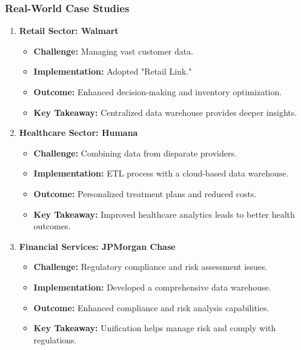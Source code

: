 \documentclass{beamer}
\begin{document}
\begin{frame}[fragile]
    \frametitle{Real-World Case Studies}
    \begin{enumerate}
        \item \textbf{Retail Sector: Walmart}
        \begin{itemize}
            \item \textbf{Challenge:} Managing vast customer data.
            \item \textbf{Implementation:} Adopted "Retail Link."
            \item \textbf{Outcome:} Enhanced decision-making and inventory optimization.
            \item \textbf{Key Takeaway:} Centralized data warehouse provides deeper insights.
        \end{itemize}
        
        \item \textbf{Healthcare Sector: Humana}
        \begin{itemize}
            \item \textbf{Challenge:} Combining data from disparate providers.
            \item \textbf{Implementation:} ETL process with a cloud-based data warehouse.
            \item \textbf{Outcome:} Personalized treatment plans and reduced costs.
            \item \textbf{Key Takeaway:} Improved healthcare analytics leads to better health outcomes.
        \end{itemize}

        \item \textbf{Financial Services: JPMorgan Chase}
        \begin{itemize}
            \item \textbf{Challenge:} Regulatory compliance and risk assessment issues.
            \item \textbf{Implementation:} Developed a comprehensive data warehouse.
            \item \textbf{Outcome:} Enhanced compliance and risk analysis capabilities.
            \item \textbf{Key Takeaway:} Unification helps manage risk and comply with regulations.
        \end{itemize}
    \end{enumerate}
\end{frame}
\end{document}
